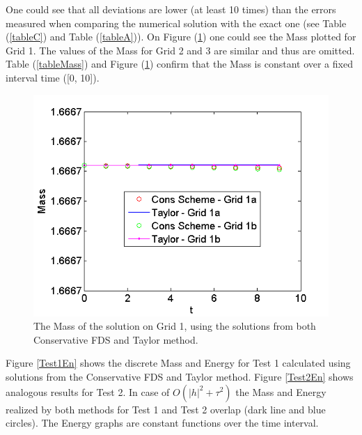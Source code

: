 \documentclass[%
 aip,
cp,  
 amsmath,amssymb,
 reprint,
]{iopconfser}
\newcommand{\rf}[1]{(\ref{#1})}
\begin{document}
One could see that all deviations are lower (at least 10 times) than the errors measured when comparing the numerical solution with the exact one (see Table \rf{tableC} and Table \rf{tableA}). On Figure \rf{massFig} one could see the Mass plotted for Grid 1. The values of the Mass for Grid 2 and 3 are similar and thus are omitted. Table \rf{tableMass} and Figure \rf{massFig} confirm that the Mass is constant over a fixed interval time ([0, 10]).

\begin{figure}[ht]\vspace{0.2cm}
	\begin{minipage}[b]{0.4\linewidth}
		 \includegraphics[width=\linewidth]{mass.png}
	\end{minipage}	
\caption{The Mass of the solution on Grid 1, using the solutions from both Conservative FDS and Taylor method.}
\label{massFig}
\end{figure}
\iffalse
Figure \ref{Test1En} shows the discrete Mass and Energy for Test 1 calculated using solutions from the Conservative FDS and Taylor method. Figure \ref{Test2En} shows analogous results for Test 2. In case of $O(|h|^2 +\tau^2)$ the Mass and Energy realized by both methods for Test 1 and Test 2 overlap (dark line and blue circles). The Energy graphs are constant functions over the time interval.
\end{document}
